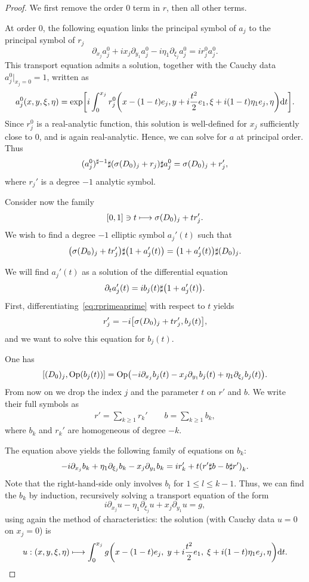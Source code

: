 \documentclass[AHL,Unicode,longabstracts,published]{cedram}
\newcommand{\Opp}{\mathrm{Op}}
\newcommand\1{\mathds{1}}
\newcommand{\dd}{\mathrm{d}}
\let\oldmapsto\mapsto
\renewcommand*{\mapsto}{\mathchoice{\longmapsto}{\oldmapsto}{\oldmapsto}{\oldmapsto}}
\let\originalleft\left
\let\originalright\right
\renewcommand{\left}{\mathopen{}\mathclose\bgroup\originalleft}
\renewcommand{\right}{\aftergroup\egroup\originalright}
\begin{document}
\begin{proof}
We first remove the order 0 term in $r$, then all other terms.

At order 0, the following equation links the principal symbol of $a_j$ to the principal symbol of $r_j$
\[
\partial_{x_j}a_j^0+ix_j\partial_{y_1}a_j^0-i\eta_1\partial_{\xi_j}a_j^0=ir_j^0a_j^0.
\]
This transport equation admits a solution, together with the Cauchy data $a_j^0|_{x_j=0}=1$, written as
\[
a_j^0(x,y,\xi,\eta)=\exp\left[i\int_0^{x_j}r_j^0\left(x-(1-t)e_j,y+i\frac{t^2}{2}e_1,\xi+i(1-t)\eta_1e_j,\eta\right)\dd t\right].
\]
Since $r_j^0$ is a real-analytic function, this solution is well-defined for $x_j$ sufficiently close to $0$, and is again real-analytic. Hence, we can solve for $a$ at principal order. Thus
\[
(a^0_j)^{\sharp -1}\sharp \left(\sigma(D_0)_j+r_j\right)\sharp a_j^0=\sigma(D_0)_j+r_j',
\]
where $r_j'$ is a degree $-1$ analytic symbol.

Consider now the family
\[
[0,1]\ni t\mapsto \sigma(D_0)_j+tr_j'.
\]
We wish to find a degree $-1$ elliptic symbol $a_j'(t)$ such that
\begin{equation}\label{eq:rprimeaprime}
\left(\sigma(D_0)_j+tr_j'\right)\sharp\left(1+a_j'(t)\right)=\left(1+a_j'(t)\right)\sharp (D_0)_j.
\end{equation}

We will find $a_j'(t)$ as a solution of the differential equation
\[
\partial_ta_j'(t)=ib_j(t)\sharp\left(1+a_j'(t)\right).
\]
First, differentiating~\eqref{eq:rprimeaprime} with respect to $t$ yields
\[
r_j'=-i\left[\sigma(D_0)_j+tr_j',b_j(t)\right],
\]
and we want to solve this equation for $b_j(t)$.

One has
\begin{equation}\label{eq:exact_conj_D0}
\left[(D_0)_j,\Opp(b_j(t))\right]
=\Opp\left(-i\partial_{x_j}b_j(t)-x_j\partial_{y_1}b_j(t)+\eta_1\partial_{\xi_j}b_j(t)\right).
\end{equation}
From now on we drop the index $j$ and the parameter $t$ on $r'$ and $b$. We write their full symbols as
\begin{align*}
r'=\sum_{k\geq 1} r_k'\qquad b=\sum_{k\geq 1}b_k,
\end{align*}
where $b_k$ and $r_k'$ are homogeneous of degree $-k$.

The equation above yields the following family of equations on $b_k$:
\[
-i\partial_{x_j}b_k +\eta_1\partial_{\xi_j}b_k-x_j\partial_{y_{1}}b_k=ir_k'+t
\left(r'\sharp b-b\sharp r'\right)_k.
\]
Note that the right-hand-side only involves $b_l$ for $1\leq l\leq k-1$. Thus, we can find the $b_k$ by induction, recursively solving a transport equation of the form
\[
i\partial_{x_j}u-\eta_{1}\partial_{\xi_j}u+x_j
\partial_{y_{1}}u=g,
\]
using again the method of characteristics: the solution (with Cauchy data $u=0$ on $x_j=0$) is
\[
u:(x,y,\xi,\eta)\mapsto
\int_0^{x_j}g\left(x-(1-t)e_j,\;y+i\frac{t^2}{2}e_1,\;\xi+i(1-t)\eta_1e_j,\eta\right)\dd t.
\]


\end{proof}
\end{document}
